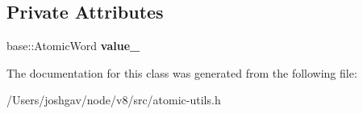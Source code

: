 \subsection*{Private Attributes}
\begin{DoxyCompactItemize}
\item 
base\+::\+Atomic\+Word {\bfseries value\+\_\+}\hypertarget{classv8_1_1internal_1_1_atomic_number_a6b867a663200c0d6df0b23f94c986771}{}\label{classv8_1_1internal_1_1_atomic_number_a6b867a663200c0d6df0b23f94c986771}

\end{DoxyCompactItemize}


The documentation for this class was generated from the following file\+:\begin{DoxyCompactItemize}
\item 
/\+Users/joshgav/node/v8/src/atomic-\/utils.\+h\end{DoxyCompactItemize}
